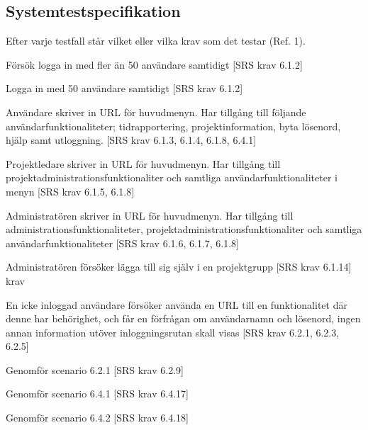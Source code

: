\documentclass[a4paper]{article}
\begin{document}
\begin{appendices}

\section{Systemtestspecifikation}

Efter varje testfall står vilket eller vilka krav som det testar (Ref. 1).

\begin{ST}


\item
Försök logga in med fler än 50 användare samtidigt [SRS krav 6.1.2]

\item
Logga in med 50 användare samtidigt [SRS krav 6.1.2]

\item 
Användare skriver in URL för huvudmenyn. Har tillgång till följande användarfunktionaliteter; tidrapportering, projektinformation, byta lösenord, hjälp samt utloggning. [SRS krav 6.1.3, 6.1.4, 6.1.8, 6.4.1]


\item 
Projektledare skriver in URL för huvudmenyn. Har tillgång till projektadministrationsfunktionaliter och samtliga användarfunktionaliteter i menyn [SRS krav 6.1.5, 6.1.8]

\item 
Administratören skriver in URL för huvudmenyn. Har tillgång till administrationsfunktionaliteter, projektadministrationsfunktionaliter och samtliga användarfunktionaliteter [SRS krav 6.1.6, 6.1.7, 6.1.8]

\item
Administratören försöker lägga till sig själv i en projektgrupp [SRS krav 6.1.14]
krav

\item
En icke inloggad användare försöker använda en URL till en funktionalitet där denne har behörighet, och får en förfrågan om användarnamn och lösenord, ingen annan information utöver inloggningsrutan skall visas [SRS krav 6.2.1, 6.2.3, 6.2.5]

\item
Genomför scenario 6.2.1 [SRS krav 6.2.9]

\item
Genomför scenario 6.4.1 [SRS krav 6.4.17]

\item
Genomför scenario 6.4.2 [SRS krav 6.4.18]


\end{ST}
\end{appendices}
\end{document}
